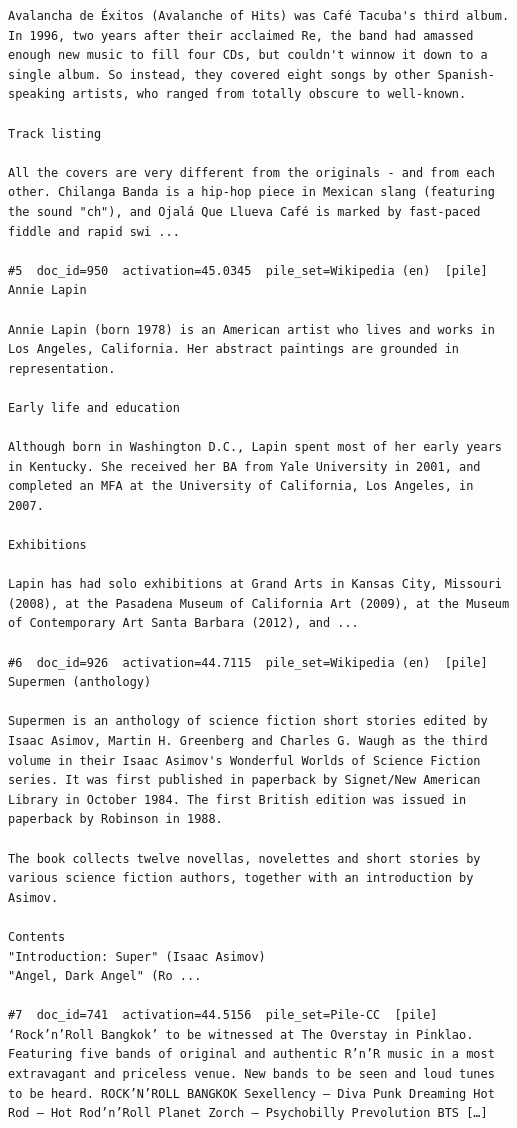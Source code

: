 \begin{verbatim}
Avalancha de Éxitos (Avalanche of Hits) was Café Tacuba's third album. In 1996, two years after their acclaimed Re, the band had amassed enough new music to fill four CDs, but couldn't winnow it down to a single album. So instead, they covered eight songs by other Spanish-speaking artists, who ranged from totally obscure to well-known.

Track listing

All the covers are very different from the originals - and from each other. Chilanga Banda is a hip-hop piece in Mexican slang (featuring the sound "ch"), and Ojalá Que Llueva Café is marked by fast-paced fiddle and rapid swi ...

#5  doc_id=950  activation=45.0345  pile_set=Wikipedia (en)  [pile]
Annie Lapin

Annie Lapin (born 1978) is an American artist who lives and works in Los Angeles, California. Her abstract paintings are grounded in representation.

Early life and education 

Although born in Washington D.C., Lapin spent most of her early years in Kentucky. She received her BA from Yale University in 2001, and completed an MFA at the University of California, Los Angeles, in 2007.

Exhibitions 

Lapin has had solo exhibitions at Grand Arts in Kansas City, Missouri (2008), at the Pasadena Museum of California Art (2009), at the Museum of Contemporary Art Santa Barbara (2012), and ...

#6  doc_id=926  activation=44.7115  pile_set=Wikipedia (en)  [pile]
Supermen (anthology)

Supermen is an anthology of science fiction short stories edited by Isaac Asimov, Martin H. Greenberg and Charles G. Waugh as the third volume in their Isaac Asimov's Wonderful Worlds of Science Fiction series. It was first published in paperback by Signet/New American Library in October 1984. The first British edition was issued in paperback by Robinson in 1988.

The book collects twelve novellas, novelettes and short stories by various science fiction authors, together with an introduction by Asimov.

Contents
"Introduction: Super" (Isaac Asimov)
"Angel, Dark Angel" (Ro ...

#7  doc_id=741  activation=44.5156  pile_set=Pile-CC  [pile]
‘Rock’n’Roll Bangkok’ to be witnessed at The Overstay in Pinklao. Featuring five bands of original and authentic R’n’R music in a most extravagant and priceless venue. New bands to be seen and loud tunes to be heard. ROCK’N’ROLL BANGKOK Sexellency – Diva Punk Dreaming Hot Rod – Hot Rod’n’Roll Planet Zorch – Psychobilly Prevolution BTS […]


\end{verbatim}

